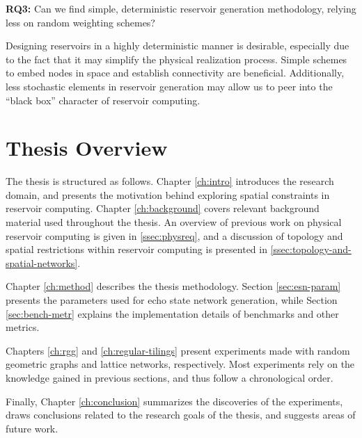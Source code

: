 \textbf{RQ3:} Can we find simple, deterministic reservoir generation
methodology, relying less on random weighting schemes?

Designing reservoirs in a highly deterministic manner is desirable, especially
due to the fact that it may simplify the physical realization process. Simple
schemes to embed nodes in space and establish connectivity are
beneficial. Additionally, less stochastic elements in reservoir generation may
allow us to peer into the ``black box'' character of reservoir computing.

\section{Thesis Overview}

The thesis is structured as follows. Chapter \ref{ch:intro} introduces the
research domain, and presents the motivation behind exploring spatial
constraints in reservoir computing. Chapter \ref{ch:background} covers relevant
background material used throughout the thesis. An overview of previous work on
physical reservoir computing is given in \ref{ssec:physreq}, and a discussion of
topology and spatial restrictions within reservoir computing is presented in
\ref{ssec:topology-and-spatial-networks}.

Chapter \ref{ch:method} describes the thesis methodology. Section
\ref{sec:esn-param} presents the parameters used for echo state network
generation, while Section \ref{sec:bench-metr} explains the implementation
details of benchmarks and other metrics.

Chapters \ref{ch:rgg} and \ref{ch:regular-tilings} present experiments made with
random geometric graphs and lattice networks, respectively. Most experiments
rely on the knowledge gained in previous sections, and thus follow a
chronological order.

Finally, Chapter \ref{ch:conclusion} summarizes the discoveries of the
experiments, draws conclusions related to the research goals of the thesis, and
suggests areas of future work.

